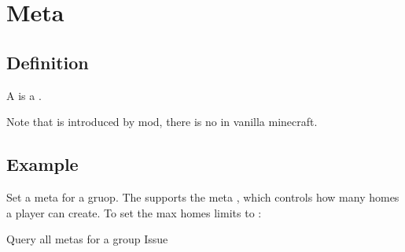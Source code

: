 \chapter{Meta}\label{ch:meta}
\section{Definition}
A  is a .

\begin{note}{}
    Note that  is introduced by  mod, there is no  in vanilla minecraft.
\end{note}


\section{Example}{}
\begin{example}{Set a meta for a gruop.}
    The  supports the meta , which controls how many homes a player can create.
    To set the max homes limits to : 
\end{example}

\begin{example}{Query all metas for a group}
    Issue 
\end{example}